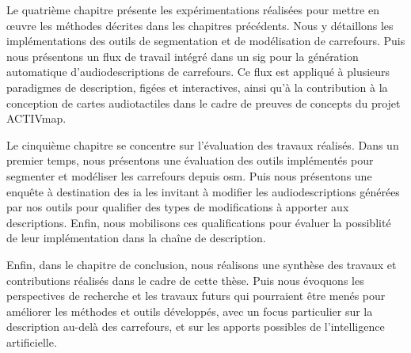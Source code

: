 \newpar{}

Le quatrième chapitre présente les expérimentations réalisées pour mettre en œuvre les méthodes décrites dans les chapitres précédents.
Nous y détaillons les implémentations des outils de segmentation et de modélisation de carrefours. Puis nous présentons un flux de travail intégré dans un \gls{sig} pour la génération automatique d'audiodescriptions de carrefours. Ce flux est appliqué à plusieurs paradigmes de description, figées et interactives, ainsi qu'à la contribution à la conception de cartes audiotactiles dans le cadre de preuves de concepts du projet ACTIVmap.

\newpar{}

Le cinquième chapitre se concentre sur l'évaluation des travaux réalisés. Dans un premier temps, nous présentons une évaluation des outils implémentés pour segmenter et modéliser les carrefours depuis \gls{osm}. Puis nous présentons une enquête à destination des \gls{ia} les invitant à modifier les audiodescriptions générées par nos outils pour qualifier des types de modifications à apporter aux descriptions. Enfin, nous mobilisons ces qualifications pour évaluer la possiblité de leur implémentation dans la chaîne de description. 

\newpar{}

Enfin, dans le chapitre de conclusion, nous réalisons une synthèse des travaux et contributions réalisés dans le cadre de cette thèse. Puis nous évoquons les perspectives de recherche et les travaux futurs qui pourraient être menés pour améliorer les méthodes et outils développés, avec un focus particulier sur la description au-delà des carrefours, et sur les apports possibles de l'intelligence artificielle.
